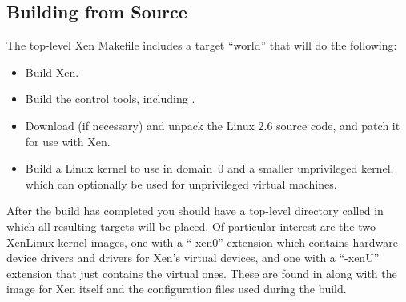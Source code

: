 %
%

\subsection{Building from Source}

The top-level Xen Makefile includes a target ``world'' that will do the
following:

\begin{itemize}
\item Build Xen.
\item Build the control tools, including \xend.
\item Download (if necessary) and unpack the Linux 2.6 source code,
  and patch it for use with Xen.
\item Build a Linux kernel to use in domain~0 and a smaller
  unprivileged kernel, which can optionally be used for unprivileged
  virtual machines.
\end{itemize}

After the build has completed you should have a top-level directory
called  in which all resulting targets will be placed. Of
particular interest are the two XenLinux kernel images, one with a
``-xen0'' extension which contains hardware device drivers and drivers
for Xen's virtual devices, and one with a ``-xenU'' extension that
just contains the virtual ones. These are found in
 along with the image for Xen itself and the
configuration files used during the build.


